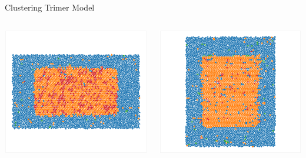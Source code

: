 \documentclass[aspectratio=169, 14pt]{beamer}
\begin{document}
\begin{frame}{Clustering Trimer Model}
  \begin{columns}
    \begin{column}{0.33\textwidth}
      \includegraphics[width=\textwidth]{clustering_results_p2.png}
    \end{column}
    \begin{column}{0.33\textwidth}
      \includegraphics[width=\textwidth]{clustering_results_p2gg.png}

\end{column}
\end{columns}
\end{frame}
\end{document}
